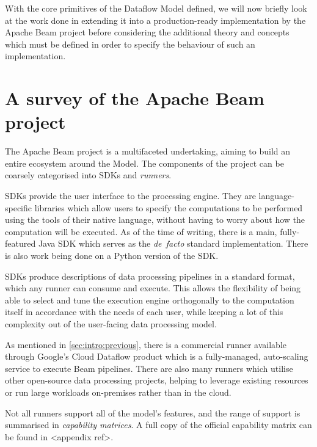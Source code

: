 With the core primitives of the Dataflow Model defined, we will now briefly look at the work done in extending it into a production-ready implementation by the Apache Beam project before considering the additional theory and concepts which must be defined in order to specify the behaviour of such an implementation.

\section{A survey of the Apache Beam project}\label{sec:prep:beam}

The Apache Beam project is a multifaceted undertaking, aiming to build an entire ecosystem around the Model.
The components of the project can be coarsely categorised into SDKs and \emph{runners}.

SDKs provide the user interface to the processing engine.
They are language-specific libraries which allow users to specify the computations to be performed using the tools of their native language, without having to worry about how the computation will be executed.
As of the time of writing, there is a main, fully-featured Java SDK which serves as the \emph{de~facto} standard implementation.
There is also work being done on a Python version of the SDK.

SDKs produce descriptions of data processing pipelines in a standard format, which any runner can consume and execute.
This allows the flexibility of being able to select and tune the execution engine orthogonally to the computation itself in accordance with the needs of each user, while keeping a lot of this complexity out of the user-facing data processing model.

As mentioned in \cref{sec:intro:previous}, there is a commercial runner available through Google's Cloud Dataflow product \cite{CloudDataflow} which is a fully-managed, auto-scaling service to execute Beam pipelines.
There are also many runners which utilise other open-source data processing projects, helping to leverage existing resources or run large workloads on-premises rather than in the cloud.

Not all runners support all of the model's features, and the range of support is summarised in \emph{capability matrices}.
A full copy of the official capability matrix can be found in <appendix ref>.


